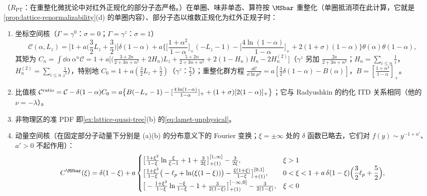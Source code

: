 \begin{proposition}\label{prop:lamet-oneloop}
（$R_{\mathrm{PT}}$：在重整化微扰论中对红外正规化的部分子态严格。）在单圈、味非单态、算符按 $\MSbar$ 重整化（单圈抵消项在此计算，它就是\cref{prop:lattice-renormalizability}(d) 的单圈内容）、部分子态以维数正规化为红外正规子时：
\begin{enumerate}[label=(\alph*),leftmargin=2em,itemsep=2pt,topsep=2pt]
\item 坐标空间核（$\Gamma=\gamma^0$：$\sigma=0$；$\Gamma=\gamma^z$：$\sigma=1$）
\begin{equation}\label{eq:lamet-coord-kernel}
\mathcal C(\alpha,L_z)=\Big[1+a\Big(\frac32L_z+\frac32\Big)\Big]\delta(1-\alpha)+a\Big\{\Big[\frac{1+\alpha^2}{1-\alpha}\Big]_+(-L_z-1)-\Big[\frac{4\ln(1-\alpha)}{1-\alpha}\Big]_++2(1+\sigma)(1-\alpha)\Big\}\theta(\alpha)\theta(1-\alpha),
\end{equation}%
其矩为 $C_n=\int\dd\alpha\,\alpha^n\mathcal C=1+a\big[\big(\frac{3+2n}{2+3n+n^2}+2H_n\big)L_z+\frac{5+2n}{2+3n+n^2}+2(1-H_n)H_n-2H^{(2)}_n\big]$（$\gamma^z$ 另加 $\frac{2a}{2+3n+n^2}$；$H_n=\sum_{i\le n}\frac1i$，$H^{(2)}_n=\sum_{i\le n}\frac1{i^2}$），特别地 $C_0=1+a(\frac32L_z+\frac52)$（$\gamma^z$：$\frac72$）；重整化群方程 $\frac{\dd\mathcal C}{\dd\ln\mu^2}=a[\frac32\delta(1-\alpha)-B(\alpha)]$，$B=[\frac{1+\alpha^2}{1-\alpha}]_+$。
\item 比值核 $\mathcal C^{\rm ratio}=\mathcal C-\delta(1-\alpha)C_0=a\big\{B(-L_z-1)-[\frac{4\ln(1-\alpha)}{1-\alpha}]_++(1+\sigma)[2(1-\alpha)]_+\big\}$；它与 Radyushkin 的约化 ITD 关系相同（他的 $\nu=-\lambda$）。%
\item 非物理区的准 PDF 即\cref{ex:lattice-quasi-tree}(b) 的\cref{eq:lamet-unphysical}。
\item 动量空间核（在固定部分子动量下分别是 (a)(b) 的分布意义下的 Fourier 变换；$\xi=\pm\infty$ 处的 $\delta$ 函数已略去，它们对 $f(y)\sim y^{-1+a'}$、$a'>0$ 不起作用）：
\begin{equation}\label{eq:lamet-CMS}
C^{\MSbar}(\xi)=\delta(1-\xi)+a\begin{cases}\big[\frac{1+\xi^2}{1-\xi}\ln\frac\xi{\xi-1}+1+\frac3{2\xi}\big]^{[1,\infty]}_{+(1)}-\frac3{2\xi},&\xi>1\\[3pt]\big[\frac{1+\xi^2}{1-\xi}\big(-\ell_p+\ln(\xi(1-\xi))\big)-\frac{\xi(1+\xi)}{1-\xi}\big]^{[0,1]}_{+(1)},&0<\xi<1\\[3pt]\big[-\frac{1+\xi^2}{1-\xi}\ln\frac{-\xi}{1-\xi}-1+\frac3{2(1-\xi)}\big]^{[-\infty,0]}_{+(1)}-\frac3{2(1-\xi)},&\xi<0\end{cases}+a\,\delta(1-\xi)\Big(\frac32\ell_p+\frac52\Big),

\end{equation}
\end{enumerate}
\end{proposition}
